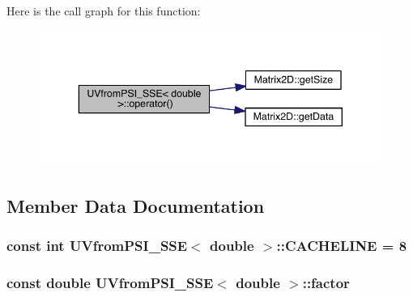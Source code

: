 Here is the call graph for this function\+:\nopagebreak
\begin{figure}[H]
\begin{center}
\leavevmode
\includegraphics[width=343pt]{d1/d2c/struct_u_vfrom_p_s_i___s_s_e_3_01double_01_4_a2854bee9f48d0ecafb436f53e8dd17ae_cgraph}
\end{center}
\end{figure}




\subsection{Member Data Documentation}
\hypertarget{struct_u_vfrom_p_s_i___s_s_e_3_01double_01_4_a7c07f66fe872ca45505200e597a227d7}{}
\subsubsection[{C\+A\+C\+H\+E\+L\+I\+N\+E}]{\setlength{\rightskip}{0pt plus 5cm}const int {\bf U\+Vfrom\+P\+S\+I\+\_\+\+S\+S\+E}$<$ double $>$\+::C\+A\+C\+H\+E\+L\+I\+N\+E = 8\hspace{0.3cm}{\ttfamily [static]}}\label{struct_u_vfrom_p_s_i___s_s_e_3_01double_01_4_a7c07f66fe872ca45505200e597a227d7}
\hypertarget{struct_u_vfrom_p_s_i___s_s_e_3_01double_01_4_a13a8e60c24481a28b30a5bfff9de6d57}{}
\subsubsection[{factor}]{\setlength{\rightskip}{0pt plus 5cm}const double {\bf U\+Vfrom\+P\+S\+I\+\_\+\+S\+S\+E}$<$ double $>$\+::factor}\label{struct_u_vfrom_p_s_i___s_s_e_3_01double_01_4_a13a8e60c24481a28b30a5bfff9de6d57}
\hypertarget{struct_u_vfrom_p_s_i___s_s_e_3_01double_01_4_ab216503dd8df3019354f56281bb0dccb}{}
